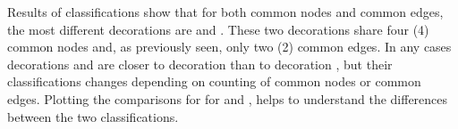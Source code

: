 \documentclass[article]{jss}\usepackage{knitr}
\begin{document}
Results of classifications show that for both common nodes and common edges, the most different decorations are  and . These two decorations share four (4) common nodes and, as previously seen, only two (2) common edges.
In any cases decorations  and  are closer to decoration  than to decoration , but their classifications changes depending on counting of common nodes or common edges. Plotting the comparisons for for  and , helps to understand the differences between the two classifications.

\begin{knitrout}
\color{fgcolor}\begin{kframe}
\begin{alltt}
\hlstd{(}\hlstd{=}\hlstd{(}\hlstd{,}\hlstd{,}\hlstd{,}\hlstd{))}
\hlstd{(}\hlstd{=}\hlstd{(}\hlstd{,}\hlstd{))}
 \hlkwb{<-} \hlstd{)}
 \hlkwb{<-}  \hlstd{(}\hlstd{,}\hlstd{),}
\hlstd{+ }                                   \hlstd{=} \hlstd{(}\hlstd{,}  \hlstd{=} \hlstd{))}
\hlstd{(}
 \hlkwb{<-} \hlstd{)}
 \hlkwb{<-}  \hlstd{(}\hlstd{,}\hlstd{),}
\hlstd{+ }                               \hlstd{=} \hlstd{(}\hlstd{,}  \hlstd{=} \hlstd{))}
\hlstd{(}
\end{alltt}
\end{kframe}\begin{figure}[H]


\end{figure}
\end{knitrout}
\end{document}

